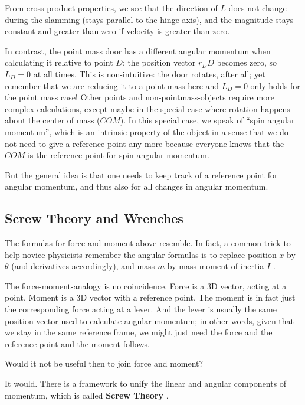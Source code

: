 \documentclass[10pt,a4paper]{article}
\begin{document}
From cross product properties, we see that the direction of \(L\) does not change during the slamming (stays parallel to the hinge axis), and the magnitude stays constant and greater than zero if velocity is greater than zero.

In contrast, the point mass door has a different angular momentum when calculating it relative to point \(D\): the position vector \(r_DD\) becomes zero, so \(L_{D} = 0\) at all times.
This is non-intuitive: the door rotates, after all; yet remember that we are reducing it to a point mass here and \(L_{D} = 0\) only holds for the point mass case!
Other points and non-pointmass-objects require more complex calculations, except maybe in the special case where rotation happens about the center of mass (\(COM\)).
In this special case, we speak of ``spin angular momentum'', which is an intrinsic property of the object in a sense that we do not need to give a reference point any more because everyone knows that the \(COM\) is the reference point for spin angular momentum.


But the general idea is that one needs to keep track of a reference point for angular momentum, and thus also for all changes in angular momentum.


\subsection{Screw Theory and Wrenches}
\label{sec:orgf617e8f}

The formulas for force and moment above resemble.
In fact, a common trick to help novice physicists remember the angular formulas is to replace position \(x\) by \(\theta\) (and derivatives accordingly), and mass \(m\) by mass moment of inertia \(I\) \citep{Tipler2007}.

The force-moment-analogy is no coincidence.
Force is a 3D vector, acting at a point.
Moment is a 3D vector with a reference point.
The moment is in fact just the corresponding force acting at a lever.
And the lever is usually the same position vector used to calculate angular momentum; in other words, given that we stay in the same reference frame, we might just need the force and the reference point and the moment follows.

Would it not be useful then to join force and moment?


It would.
There is a framework to unify the linear and angular components of momentum, which is called \textbf{Screw Theory} \citep{Ball1876,Lynch2017}.
\end{document}
